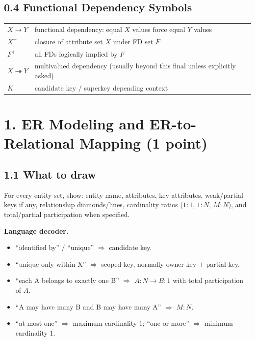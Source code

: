 \documentclass[10pt,a4paper]{article}
\begin{document}
\subsection{0.4 Functional Dependency Symbols}
\begin{center}
\begin{tabularx}{\textwidth}{p{2.5cm} X}
\toprule
$X\to Y$ & functional dependency: equal $X$ values force equal $Y$ values\\
$X^+$ & closure of attribute set $X$ under FD set $F$\\
$F^+$ & all FDs logically implied by $F$\\
$X\twoheadrightarrow Y$ & multivalued dependency (usually beyond this final unless explicitly asked)\\
$K$ & candidate key / superkey depending context\\
\bottomrule
\end{tabularx}
\end{center}

\section{1. ER Modeling and ER-to-Relational Mapping (1 point)}

\subsection{1.1 What to draw}
For every entity set, show: entity name, attributes, key attributes, weak/partial keys if any, relationship diamonds/lines, cardinality ratios ($1{:}1$, $1{:}N$, $M{:}N$), and total/partial participation when specified.

\begin{rulebox}
\textbf{Language decoder.}
\begin{itemize}
\item ``identified by'' / ``unique'' $\Rightarrow$ candidate key.
\item ``unique only within X'' $\Rightarrow$ scoped key, normally owner key $+$ partial key.
\item ``each A belongs to exactly one B'' $\Rightarrow$ $A:N \to B:1$ with total participation of $A$.
\item ``A may have many B and B may have many A'' $\Rightarrow$ $M{:}N$.
\item ``at most one'' $\Rightarrow$ maximum cardinality $1$; ``one or more'' $\Rightarrow$ minimum cardinality $1$.
\end{itemize}
\end{rulebox}
\end{document}
